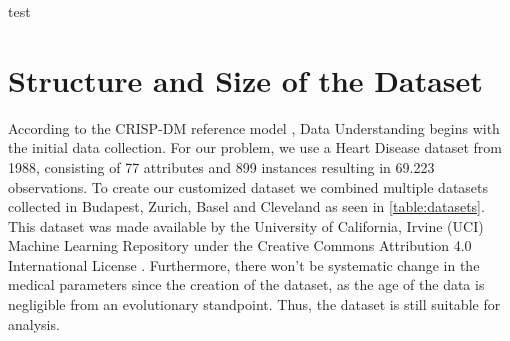 \documentclass[11pt,titlepage,oneside,openany]{article}
\begin{document}
\maketitle
test
\section{Structure and Size of the Dataset} \label{sec:dataUnderstanding}


According to the CRISP-DM reference model \citep{chapman2000}, Data Understanding begins with the initial data collection. For our problem, we use a Heart Disease dataset from 1988, consisting of 77 attributes and 899 instances resulting in 69.223 observations. To create our customized dataset we combined multiple datasets collected in Budapest, Zurich, Basel and Cleveland as seen in \cref{table:datasets}. This dataset was made available by the University of California, Irvine (UCI) Machine Learning Repository under the Creative Commons Attribution 4.0 International License \citep{janosi1988}. Furthermore, there won't be systematic change in the medical parameters since the creation of the dataset, as the age of the data is negligible from an evolutionary standpoint. Thus, the dataset is still suitable for analysis.
\end{document}
